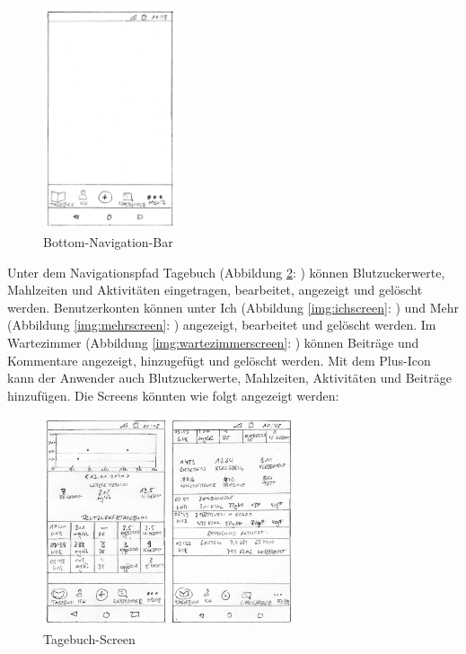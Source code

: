\begin{figure}[H]
	\centering
	\includegraphics[width=0.35\textwidth]{images/navigationbar.png}
	\captionsetup{justification=centering}
	\caption{Bottom-Navigation-Bar}
	\label{img:navigationbar}
\end{figure}
Unter dem Navigationspfad \glqq Tagebuch\grqq{} (Abbildung \ref{img:tagebuchscreen}: \glqq {}\grqq{}) können Blutzuckerwerte, Mahlzeiten und Aktivitäten eingetragen, bearbeitet, angezeigt und gelöscht werden. Benutzerkonten können unter \glqq Ich\grqq{} (Abbildung \ref{img:ichscreen}: \glqq {}\grqq{}) und \glqq Mehr\grqq{} (Abbildung \ref{img:mehrscreen}: \glqq {}\grqq{}) angezeigt, bearbeitet und gelöscht werden. Im \glqq Wartezimmer\grqq{} (Abbildung \ref{img:wartezimmerscreen}: \glqq {}\grqq{}) können Beiträge und Kommentare angezeigt, hinzugefügt und gelöscht werden. Mit dem Plus-Icon kann der Anwender auch Blutzuckerwerte, Mahlzeiten, Aktivitäten und Beiträge hinzufügen. Die Screens könnten wie folgt angezeigt werden:
\begin{figure}[H]
	\centering
	\includegraphics[width=0.66\textwidth]{images/tagebuchscreen.png}
	\captionsetup{justification=centering}
	\caption{Tagebuch-Screen}
	\label{img:tagebuchscreen}
\end{figure}
